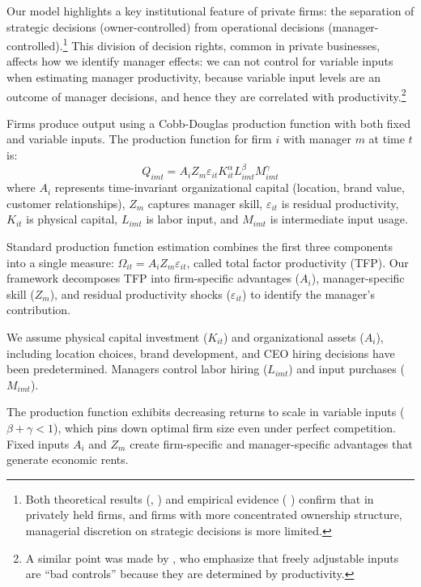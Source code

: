 \documentclass[11pt,a4paper]{article}
\begin{document}
Our model highlights a key institutional feature of private firms: the separation of strategic decisions (owner-controlled) from operational decisions (manager-controlled).\footnote{Both theoretical results (\citep{fama1983separation, jensen1976theory}, \citet{burkart2003family}) and empirical evidence (\citep{wang2019decentralization, buffington2017mops} \citet{bloom2012organization}) confirm that in privately held firms, and firms with more concentrated ownership structure, managerial discretion on strategic decisions is more limited.} This division of decision rights, common in private businesses, affects how we identify manager effects: we can not control for variable inputs when estimating manager productivity, because variable input levels are an outcome of manager decisions, and hence they are correlated with productivity.\footnote{A similar point was made by \citet{Gandhi2020-nu}, who emphasize that freely adjustable inputs are ``bad controls'' because they are determined by productivity.} 

Firms produce output using a Cobb-Douglas production function with both fixed and variable inputs. The production function for firm $i$ with manager $m$ at time $t$ is:
\begin{equation}\label{eq:production}
Q_{imt} = A_i Z_{m} \varepsilon_{it} K_{it}^\alpha L_{imt}^{\beta} M_{imt}^{\gamma}
\end{equation}
where $A_i$ represents time-invariant organizational capital (location, brand value, customer relationships), $Z_m$ captures manager skill, $\varepsilon_{it}$ is residual productivity, $K_{it}$ is physical capital, $L_{imt}$ is labor input, and $M_{imt}$ is intermediate input usage. 

Standard production function estimation combines the first three components into a single measure: $\Omega_{it} = A_i Z_m \varepsilon_{it}$, called total factor productivity (TFP). Our framework decomposes TFP into firm-specific advantages ($A_i$), manager-specific skill ($Z_m$), and residual productivity shocks ($\varepsilon_{it}$) to identify the manager's contribution.

We assume physical capital investment ($K_{it}$) and organizational assets ($A_i$), including location choices, brand development, and CEO hiring decisions have been predetermined. Managers control labor hiring ($L_{imt}$) and input purchases ($M_{imt}$). 

The production function exhibits decreasing returns to scale in variable inputs ($\beta + \gamma < 1$), which pins down optimal firm size even under perfect competition. Fixed inputs $A_i$ and $Z_m$ create firm-specific and manager-specific advantages that generate economic rents.
\end{document}
